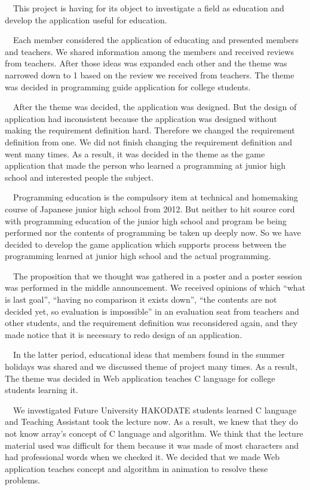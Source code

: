 \documentclass[openany,11pt,papersize]{jsbook}
\newcounter{hoge}
\newcommand{\fake}[1]{\whiledo{\thehoge<70}{#1\stepcounter{hoge}}%
  \setcounter{hoge}{0}}
\begin{document}
\begin{eabstract} 
　This project is having for its object to investigate a field as education and develop the application useful for education.

　Each member considered the application of educating and presented members and teachers. We shared information among the members and received reviews from teachers. After those ideas was expanded each other and the theme was narrowed down to 1 based on the review we received from teachers. The theme was decided in programming guide application for college students.

　After the theme was decided, the application was designed. But the design of application had inconsistent because the application was designed without making the requirement definition hard. Therefore we changed the requirement definition from one. We did not finish changing the requirement definition and went many times. As a result, it was decided in the theme as the game application that made the person who learned a programming at junior high school and interested people the subject.

　Programming education is the compulsory item at technical and homemaking course of Japanese junior high school from 2012. But neither to hit source cord with programming education of the junior high school and program be being performed nor the contents of programming be taken up deeply now. So we have decided to develop the game application which supports process between the programming learned at junior high school and the actual programming.

　The proposition that we thought was gathered in a poster and a poster session was performed in the middle announcement. We received opinions of which ``what is last goal'', ``having no comparison it exists down'', ``the contents are not decided yet, so evaluation is impossible'' in an evaluation seat from teachers and other students, and the requirement definition was reconsidered again, and they made notice that it is necessary to redo design of an application.

　In the latter period, educational ideas that members found in the summer holidays was shared and we discussed theme of project many times. As a result, The theme was decided in Web application teaches C language for college students learning it.

　We investigated Future University HAKODATE students learned C language and Teaching Assistant took the lecture now. As a result, we knew that they do not know array's concept of C language and algorithm. We think that the lecture material used was difficult for them because it was made of most characters and had professional words when we checked it. We decided that we made Web application teaches concept and algorithm in animation to resolve these problems.


\end{eabstract}
\end{document}

